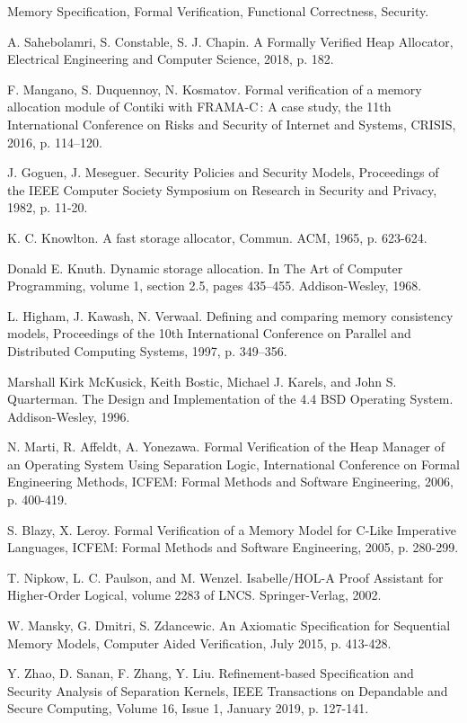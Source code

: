 \documentclass[10pt,conference,compsoc]{IEEEtran}
\begin{document}
\begin{IEEEkeywords}
Memory Specification, Formal Verification, Functional Correctness, Security.
\end{IEEEkeywords}







\begin{thebibliography}{00}
	A. Sahebolamri, S. Constable, S. J. Chapin. A Formally Verified Heap Allocator, Electrical Engineering and Computer Science, 2018, p. 182.
	
	F. Mangano, S. Duquennoy, N. Kosmatov. Formal verification of a memory allocation module of Contiki with FRAMA-C : A case study, the 11th International Conference on Risks and Security of Internet and Systems, CRISIS, 2016, p. 114–120.
	
	J. Goguen, J. Meseguer. Security Policies and Security Models, Proceedings of the IEEE Computer Society Symposium on Research in Security and Privacy, 1982, p. 11-20.
	
	K. C. Knowlton. A fast storage allocator, Commun. ACM, 1965, p. 623-624.
	
	Donald E. Knuth. Dynamic storage allocation. In The Art of Computer Programming, volume 1, section 2.5, pages 435–455. Addison-Wesley, 1968.
	
	L. Higham, J. Kawash, N. Verwaal. Defining and comparing memory consistency
	models, Proceedings of the 10th International Conference on Parallel and Distributed Computing Systems, 1997, p. 349–356.
	
	Marshall Kirk McKusick, Keith Bostic, Michael J. Karels, and John S. Quarterman. The Design and Implementation of the 4.4 BSD Operating System. Addison-Wesley, 1996.
	
	N. Marti, R. Affeldt, A. Yonezawa. Formal Verification of the Heap Manager of an Operating System Using Separation Logic, International Conference on Formal Engineering Methods, ICFEM: Formal Methods and Software Engineering, 2006, p. 400-419.
	
	S. Blazy, X. Leroy. Formal Verification of a Memory Model for C-Like Imperative Languages, ICFEM: Formal Methods and Software Engineering, 2005, p. 280-299.
	
	T. Nipkow, L. C. Paulson, and M. Wenzel. Isabelle/HOL-A Proof Assistant for Higher-Order Logical, volume 2283 of LNCS. Springer-Verlag, 2002.
	
	W. Mansky, G. Dmitri, S. Zdancewic. An Axiomatic Specification for Sequential Memory Models, Computer Aided Verification, July 2015, p. 413-428.
	
	Y. Zhao, D. Sanan, F. Zhang, Y. Liu. Refinement-based Specification and Security Analysis of Separation Kernels, IEEE Transactions on Depandable and Secure Computing, Volume 16, Issue 1, January 2019, p. 127-141.
\end{thebibliography}
\end{document}
